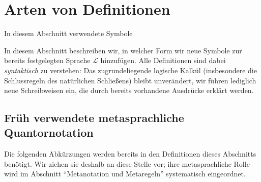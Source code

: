 \documentclass[main.tex]{subfiles}
\begin{document}
\section{Arten von Definitionen}

\begin{DeltaContext}{In diesem Abschnitt verwendete Symbole}
\end{DeltaContext}

In diesem Abschnitt beschreiben wir, in welcher Form wir neue
Symbole zur bereits festgelegten Sprache \(\mathcal L\) hinzufügen.
Alle Definitionen sind dabei \emph{syntaktisch} zu verstehen:
Das zugrundeliegende logische Kalkül (insbesondere die
Schlussregeln des natürlichen Schließens) bleibt unverändert, wir
führen lediglich neue Schreibweisen ein, die durch bereits
vorhandene Ausdrücke erklärt werden.

\subsection{Früh verwendete metasprachliche Quantornotation}

Die folgenden Abkürzungen werden bereits in den Definitionen dieses
Abschnitts benötigt. Wir ziehen sie deshalb an diese Stelle vor; ihre
metasprachliche Rolle wird im Abschnitt \enquote{Metanotation und
Metaregeln} systematisch eingeordnet.
\end{document}
